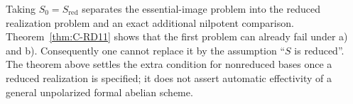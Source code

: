 \begin{remark}
Taking $S_0=S_{\mathrm{red}}$ separates the essential-image problem
into the reduced realization problem and an exact additional
nilpotent comparison. Theorem~\ref{thm:C-RD11} shows that the first
problem can already fail under a) and b). Consequently one cannot
replace it by the assumption ``$S$ is reduced''. The theorem above
settles the extra condition for nonreduced bases once a reduced
realization is specified; it does not assert automatic effectivity
of a general unpolarized formal abelian scheme.
\end{remark}
